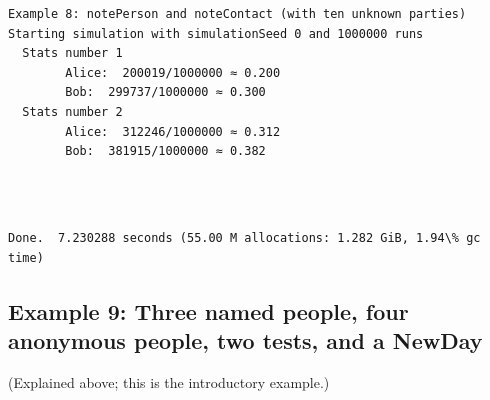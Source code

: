 \documentclass[11pt]{article}
\begin{document}
    \begin{Verbatim}[commandchars=\\\{\}]
Example 8: notePerson and noteContact (with ten unknown parties)
Starting simulation with simulationSeed 0 and 1000000 runs
  Stats number 1
        Alice:  200019/1000000 ≈ 0.200
        Bob:  299737/1000000 ≈ 0.300
  Stats number 2
        Alice:  312246/1000000 ≈ 0.312
        Bob:  381915/1000000 ≈ 0.382
    \end{Verbatim}

    \begin{center}
    \end{center}
    { \hspace*{\fill} \\}
    
    \begin{Verbatim}[commandchars=\\\{\}]

Done.  7.230288 seconds (55.00 M allocations: 1.282 GiB, 1.94\% gc time)
    \end{Verbatim}
\newpage
    \hypertarget{example-9-three-named-people-four-anonymous-people-two-tests-and-a-newday}{%
\subsection{Example 9: Three named people, four anonymous people, two
tests, and a
NewDay}\label{example-9-three-named-people-four-anonymous-people-two-tests-and-a-newday}}

(Explained above; this is the introductory example.)
\end{document}
